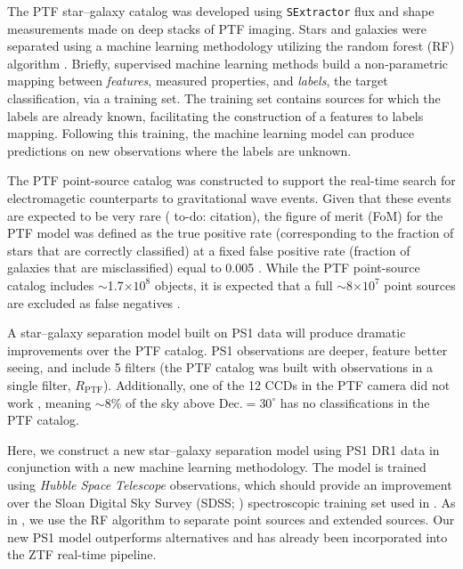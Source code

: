 \documentclass[twocolumn]{aastex62}
\newcommand{\todo}[1]{{\color{magenta} to-do: {#1}}}
\begin{document}
The PTF star--galaxy catalog was developed using \texttt{SExtractor}
\citep{bertin96} flux and shape measurements made on deep stacks of PTF
imaging. Stars and galaxies were separated using a machine learning
methodology utilizing the random forest (RF) algorithm \citep{Breiman01}.
Briefly, supervised machine learning methods build a non-parametric mapping
between \textit{features}, measured properties, and \textit{labels}, the
target classification, via a training set. The training set contains sources
for which the labels are already known, facilitating the construction of a
features to labels mapping. Following this training, the machine learning
model can produce predictions on new observations where the labels are
unknown.

The PTF point-source catalog was constructed to support the real-time search
for electromagetic counterparts to gravitational wave events. Given that
these events are expected to be very rare (\todo{citation}), the figure of
merit (FoM) for the PTF model was defined as the true positive rate
(corresponding to the fraction of stars that are correctly classified) at a
fixed false positive rate (fraction of galaxies that are misclassified) equal
to 0.005 \citep{Miller17}. While the PTF point-source catalog includes
$\sim$1.7$\times 10^8$ objects, it is expected that a full
$\sim$8$\times10^7$ point sources are excluded as false negatives
\citep{Miller17}.

A star--galaxy separation model built on PS1 data will produce dramatic
improvements over the PTF catalog. PS1 observations are deeper, feature
better seeing, and include 5 filters (the PTF catalog was built with
observations in a single filter, $R_\mathrm{PTF}$). Additionally, one of the
12 CCDs in the PTF camera did not work \citep{Law09}, meaning $\sim$8\% of
the sky above $\mathrm{Dec.} = 30^\circ$ has no classifications in the PTF
catalog.

Here, we construct a new star--galaxy separation model using PS1 DR1 data in
conjunction with a new machine learning methodology. The model is trained
using \textit{Hubble Space Telescope} observations, which should provide an
improvement over the Sloan Digital Sky Survey (SDSS; \citealt{York00})
spectroscopic training set used in \citet{Miller17}. As in \citet{Miller17},
we use the RF algorithm to separate point sources and extended sources. Our
new PS1 model outperforms alternatives and has already been incorporated into
the ZTF real-time pipeline.
\end{document}
